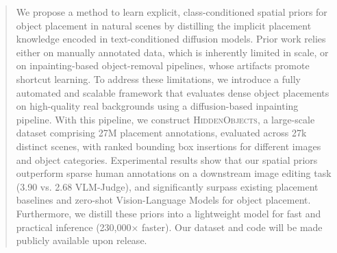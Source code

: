 



\begin{abstract}

We propose a method to learn explicit, class-conditioned spatial priors for object placement in natural scenes by distilling the implicit placement knowledge encoded in text-conditioned diffusion models. Prior work relies either on manually annotated data, which is inherently limited in scale, or on inpainting-based object-removal pipelines, whose artifacts promote shortcut learning. To address these limitations, we introduce a fully automated and scalable framework that evaluates dense object placements on high-quality real backgrounds using a diffusion-based inpainting pipeline. With this pipeline, we construct \textsc{HiddenObjects}, a large-scale dataset comprising 27M placement annotations, evaluated across 27k distinct scenes, with ranked bounding box insertions for different images and object categories. Experimental results show that our spatial priors outperform sparse human annotations on a downstream image editing task (3.90 vs. 2.68 VLM-Judge), and significantly surpass existing placement baselines and zero-shot Vision-Language Models for object placement. 
Furthermore, we distill these priors into a lightweight model for fast and practical inference (230,000× faster). Our dataset and code will be made publicly available upon release.







\end{abstract}